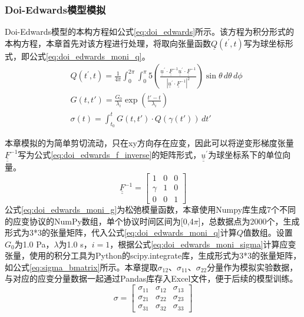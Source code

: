 \subsubsection{Doi-Edwards模型模拟}
Doi-Edwards模型的本构方程如公式\eqref{eq:doi_edwards}所示。该方程为积分形式的本构方程，本章首先对该方程进行处理，将取向张量函数$\underline{Q}(t^{\prime},t)$写为球坐标形式，即公式\eqref{eq:doi_edwards_moni_q}。
\begin{align}
   & Q(t^{\prime},t) = \frac{1}{4\pi} \int_{0}^{2\pi} \int_{0}^{\pi} 5 \left( \frac{\underline{\underline{u}}^{\prime} \cdot \underline{\underline{F}}^{-1} \underline{\underline{u}}^{\prime} \cdot \underline{\underline{F}}^{-1}}{|\underline{\underline{u}}^{\prime} \cdot \underline{\underline{F}}^{-1}|^{2}} \right) \sin\theta \, d\theta \, d\phi   \label{eq:doi_edwards_moni_q} \\
   & G(t, t') = \frac{G_0}{\lambda_i} \exp\left( \frac{t' - t}{\lambda_i} \right)   \label{eq:doi_edwards_moni_g}                                                                                                                                                                                                                                                                          \\
   & \sigma(t) = \int_{t_0}^t G(t, t') \cdot Q(\gamma(t')) \, dt' \label{eq:doi_edwards_moni_sigma}
\end{align}

本章模拟的为简单剪切流动，只在xy方向存在应变，因此可以将逆变形梯度张量$\underline{\underline{F}}^{-1}$写为公式\eqref{eq:doi_edwards_f_inverse}的矩阵形式，$\underline{\underline{u}}^{\prime}$为球坐标系下的单位向量。
\begin{equation}
  \underline{\underline{F}}^{-1} = \begin{bmatrix}
    1      & 0 & 0 \\
    \gamma & 1 & 0 \\
    0      & 0 & 1
  \end{bmatrix} \label{eq:doi_edwards_f_inverse}
\end{equation}
公式\eqref{eq:doi_edwards_moni_g}为松弛模量函数，本章使用Numpy库生成7个不同的应变协议的NumPy数组，单个协议时间区间为[0,4$\pi$]，总数据点为2000个，生成形式为3*3的张量矩阵，代入公式\eqref{eq:doi_edwards_moni_q}计算$Q$值数组。设置$G_0$为1.0 Pa，$\lambda$为1.0 s，$i=1$，根据公式\eqref{eq:doi_edwards_moni_sigma}计算应变张量，使用的积分工具为Python的scipy.integrate库，生成形式为3*3的张量矩阵，如公式\eqref{eq:sigma_bmatrix}所示。本章提取$
  \sigma_{12}$、$\sigma_{11}$、$\sigma_{22}$分量作为模拟实验数据，与对应的应变分量数据一起通过Pandas库存入Excel文件，便于后续的模型训练。
\begin{equation}
  \sigma = \begin{bmatrix}
    \sigma_{11} & \sigma_{12} & \sigma_{13} \\
    \sigma_{21} & \sigma_{22} & \sigma_{23} \\
    \sigma_{31} & \sigma_{32} & \sigma_{33}
  \end{bmatrix} \label{eq:sigma_bmatrix}
\end{equation}

